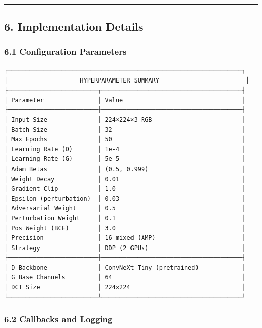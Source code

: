 \begin{center}\rule{0.5\linewidth}{0.5pt}\end{center}

\subsection{6. Implementation Details}\label{implementation-details-1}

\subsubsection{6.1 Configuration
Parameters}\label{configuration-parameters}

\begin{verbatim}
┌─────────────────────────────────────────────────────────────────┐
│                    HYPERPARAMETER SUMMARY                        │
├─────────────────────────┬───────────────────────────────────────┤
│ Parameter               │ Value                                 │
├─────────────────────────┼───────────────────────────────────────┤
│ Input Size              │ 224×224×3 RGB                         │
│ Batch Size              │ 32                                    │
│ Max Epochs              │ 50                                    │
│ Learning Rate (D)       │ 1e-4                                  │
│ Learning Rate (G)       │ 5e-5                                  │
│ Adam Betas              │ (0.5, 0.999)                          │
│ Weight Decay            │ 0.01                                  │
│ Gradient Clip           │ 1.0                                   │
│ Epsilon (perturbation)  │ 0.03                                  │
│ Adversarial Weight      │ 0.5                                   │
│ Perturbation Weight     │ 0.1                                   │
│ Pos Weight (BCE)        │ 3.0                                   │
│ Precision               │ 16-mixed (AMP)                        │
│ Strategy                │ DDP (2 GPUs)                          │
├─────────────────────────┼───────────────────────────────────────┤
│ D Backbone              │ ConvNeXt-Tiny (pretrained)            │
│ G Base Channels         │ 64                                    │
│ DCT Size                │ 224×224                               │
└─────────────────────────┴───────────────────────────────────────┘
\end{verbatim}

\subsubsection{6.2 Callbacks and Logging}\label{callbacks-and-logging}

